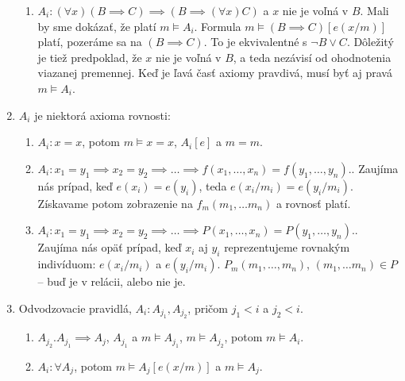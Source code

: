 \begin{dokaz}
\begin{enumerate}
\begin{enumerate}
            \item $A_i: (\forall x) (B \implies C) \implies (B \implies
            (\forall x) C)$ a $x$ nie je voľná v $B$. Mali by sme dokázať,
            že platí $m \models A_i$. Formula  $m \models (B \implies
            C)[e(x/m)]$ platí, pozeráme sa na $(B \implies C)$. To je
            ekvivalentné s $\neg B \lor C$. Dôležitý je tiež predpoklad, že
            $x$ nie je voľná v $B$, a teda nezávisí od ohodnotenia viazanej
            premennej. Keď je ľavá časť axiomy pravdivá, musí byť aj pravá
             $m \models A_i$.
	\end{enumerate}
	\item $A_i$ je niektorá axioma rovnosti:
	\begin{enumerate}
            \item $A_i: x=x$, potom $m\models x=x$, $A_i[e]$ a $m=m$.
            \item $A_i: x_1 = y_1 \implies x_2 = y_2 \implies \ldots \implies
            f(x_1, \ldots, x_n) = f(y_1, \ldots, y_n).$. Zaujíma nás prípad,
            keď  $e(x_i) = e(y_i)$, teda
            $e(x_i/m_i)=e(y_i/m_i)$.
            Získavame potom zobrazenie na
            $f_m(m_1, \ldots m_n)$ a rovnosť platí.
            \item $A_i: x_1 = y_1 \implies x_2 = y_2 \implies \ldots \implies
            P(x_1, \ldots, x_n) = P(y_1, \ldots, y_n).$. Zaujíma nás opäť
            prípad, keď $x_i$ aj $y_i$ reprezentujeme rovnakým indivíduom:
            $e(x_i/m_i)$ a $e(y_i/m_i)$.  $P_m(m_1, \ldots, m_n)$, $(m_1,
            \ldots m_n) \in P$ -- buď je v relácii, alebo nie je.
	\end{enumerate}
	\item Odvodzovacie pravidlá, $A_i: A_{j_1}, A_{j_2}$, pričom $j_1 < i$ a
	$j_2 < i$.
	\begin{enumerate}
            \item $A_{j_2}. A_{j_1} \implies A_j$, $A_{j_1}$ a $m \models
            A_{j_1}$, $m \models A_{j_2}$, potom $m \models A_i$.
            \item $A_i: \forall A_j$, potom $m \models A_j[e(x/m)]$ a $m
            \models A_j$.
	\end{enumerate}

\end{enumerate}

\end{dokaz}

